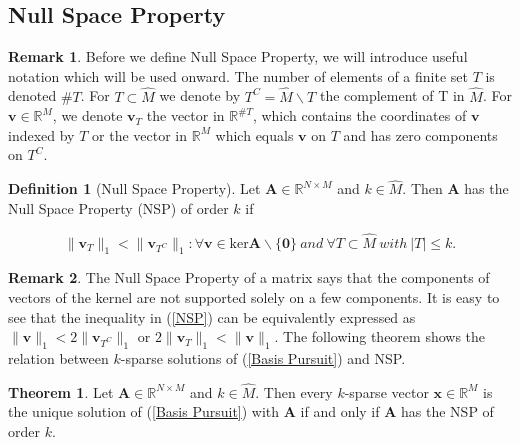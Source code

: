 \documentclass[11pt,oneside,czech,american]{book} %
\theoremstyle{definition} %
\newtheorem{thm}{Theorem}
\theoremstyle{definition}
\newtheorem{defn}{Definition}
\newtheorem{rmrk}{Remark}
\begin{document}
\subsection*{Null Space Property}

\begin{rmrk}
	Before we define Null Space Property, we will introduce useful notation which will be used onward. The number of elements of a finite set $T$ is denoted $\#T$. For $T\subset \hat{M}$ we denote by $T^{C} = \hat{M} \backslash T$ the complement of T in $\hat{M}$. For $\bm{v} \in \mathbb{R}^M$, we denote $\bm{v}_{T}$ the vector in $\mathbb{R}^{\#T}$, which contains the coordinates of $\bm{v}$ indexed by $T$ or the vector in $\mathbb{R}^{M}$ which equals $\bm{v}$ on $T$ and has zero components on $T^{C}$. %
\end{rmrk}

\begin{defn}[Null Space Property]
	Let $\bm{A} \in \mathbb{R}^{N \times M}$ and $k \in \hat{M}$. Then $\bm{A}$ has the Null Space Property (NSP) of order $k$ if
	
	\begin{equation}
		\lVert \bm{v}_{T}\rVert_{1} <  \lVert \bm{v}_{{T}^{C}}\rVert_{1}: \forall \bm{v} \in \text{ker} \bm{A} \backslash \{\bm{0}\} \ and \ \forall T \subset \hat{M} \ with \ |T|\leq k. \label{NSP}
	\end{equation}
	
\end{defn}

\begin{rmrk}
	The Null Space Property of a matrix says that the components of vectors of the kernel are not supported solely on a few components. It is easy to see that the inequality in (\ref{NSP}) can be equivalently expressed as $\lVert \bm{v}\rVert_{1} <  2\lVert \bm{v}_{{T}^{C}}\rVert_{1}$ or $2\lVert \bm{v}_{T}\rVert_{1} <  \lVert \bm{v}\rVert_{1}$. The following theorem shows the relation between $k$-sparse solutions of (\ref{Basis Pursuit}) and NSP.
\end{rmrk}

\begin{thm}
	Let $\bm{A} \in \mathbb{R}^{N \times M}$ and $k \in \hat{M}$. Then every $k$-sparse vector $\bm{x} \in \mathbb{R}^{M}$ is the unique solution of (\ref{Basis Pursuit}) with $\bm{A}$ if and only if $\bm{A}$ has the NSP of order $k$.
\end{thm}
\end{document}
